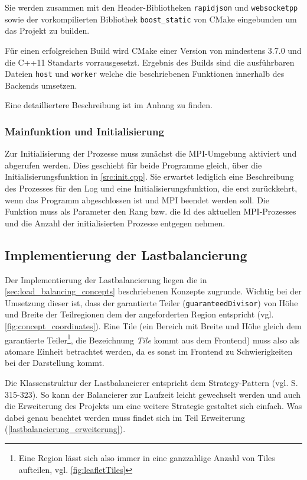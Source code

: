 Sie werden zusammen mit den Header-Bibliotheken \verb|rapidjson| und \verb|websocketpp| sowie der vorkompilierten
Bibliothek \verb|boost_static| von CMake eingebunden um das Projekt zu builden.

Für einen erfolgreichen Build wird CMake einer Version von mindestens 3.7.0 und die C++11 Standarts vorrausgesetzt.
Ergebnis des Builds sind die ausführbaren Dateien \verb|host| und \verb|worker| welche die
beschriebenen Funktionen innerhalb des Backends umsetzen.

Eine detailliertere Beschreibung ist im Anhang zu finden.

\subsubsection{Mainfunktion und Initialisierung}

Zur Initialisierung der Prozesse muss zunächst die MPI-Umgebung aktiviert und abgerufen werden.
Dies geschieht für beide Programme gleich, über die Initialisierungsfunktion in \autoref{src:init.cpp}.
Sie erwartet lediglich eine Beschreibung des Prozesses für den Log und eine Initialisierungsfunktion,
die erst zurückkehrt, wenn das Programm abgeschlossen ist und MPI beendet werden soll.
Die Funktion muss als Parameter den Rang bzw. die Id des aktuellen MPI-Prozesses und die Anzahl der initialisierten
Prozesse entgegen nehmen.

\subsection{Implementierung der Lastbalancierung}\label{sec:load_balancing}
Der Implementierung der Lastbalancierung liegen die in \autoref{sec:load_balancing_concepts} beschriebenen Konzepte zugrunde.
Wichtig bei der Umsetzung dieser ist, dass der garantierte Teiler (\verb|guaranteedDivisor|) von Höhe und Breite der Teilregionen dem der angeforderten Region entspricht (vgl. \autoref{fig:concept_coordinates}).
Eine Tile (ein Bereich mit Breite und Höhe gleich dem garantierte Teiler\footnote{Eine Region lässt sich also immer in eine ganzzahlige Anzahl von Tiles aufteilen, vgl. \autoref{fig:leafletTiles}}, die Bezeichnung \textit{Tile} kommt aus dem Frontend) muss also als atomare Einheit betrachtet werden, da es sonst im Frontend zu Schwierigkeiten bei der Darstellung kommt.

Die Klassenstruktur der Lastbalancierer entspricht dem Strategy-Pattern (vgl. \cite{gamma_design_1995} S. 315-323). So kann der Balancierer zur Laufzeit leicht gewechselt werden und auch die Erweiterung des Projekts um eine weitere Strategie gestaltet sich einfach.
Was dabei genau beachtet werden muss findet sich im Teil Erweiterung (\ref{lastbalancierung_erweiterung}).

